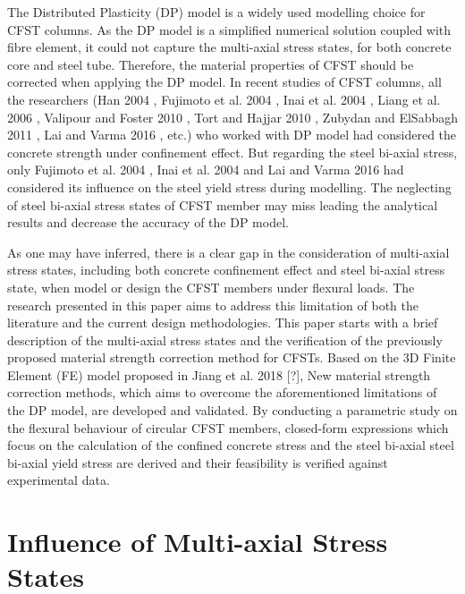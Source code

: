 \documentclass[12pt,a4]{article}
\begin{document}
	\par
	The Distributed Plasticity (DP) model is a widely used modelling choice for CFST columns. As the DP model is a simplified numerical solution coupled with fibre element, it could not capture the multi-axial stress states, for both concrete core and steel tube. Therefore, the material properties of CFST should be corrected when applying the DP model. In recent studies of CFST columns, all the researchers (Han 2004 \cite{RN21}, Fujimoto et al. 2004 \cite{RN15}, Inai et al. 2004 \cite{RN30}, Liang et al. 2006 \cite{RN34}, Valipour and Foster 2010 \cite{RN50}, Tort and Hajjar 2010 \cite{RN46}, Zubydan and ElSabbagh 2011 \cite{RN60}, Lai and Varma 2016 \cite{RN32}, etc.) who worked with DP model had considered the concrete strength under confinement effect. But regarding the steel bi-axial stress, only Fujimoto et al. 2004 \cite{RN15}, Inai et al. 2004 \cite{RN30} and Lai and Varma 2016 \cite{RN32} had considered its influence on the steel yield stress during modelling. The neglecting of steel bi-axial stress states of CFST member may miss leading the analytical results and decrease the accuracy of the DP model. 
	\par
	As one may have inferred, there is a clear gap in the consideration of multi-axial stress states, including both concrete confinement effect and steel bi-axial stress state, when model or design the CFST members under flexural loads. The research presented in this paper aims to address this limitation of both the literature and the current design methodologies. This paper starts with a brief description of the multi-axial stress states and the verification of the previously proposed material strength correction method for CFSTs. Based on the 3D Finite Element (FE) model proposed in Jiang et al. 2018 [?], New material strength correction methods, which aims to overcome the aforementioned limitations of the DP model, are developed and validated. By conducting a parametric study on the flexural behaviour of circular CFST members, closed-form expressions which focus on the calculation of the confined concrete stress and the steel bi-axial steel bi-axial yield stress are derived and their feasibility is verified against experimental data.
	
	\section{Influence of Multi-axial Stress States}
\end{document}
